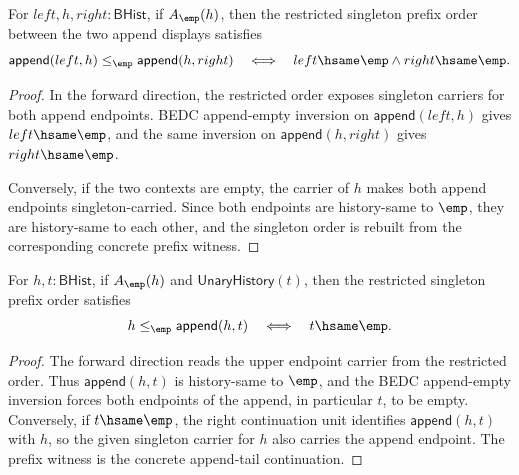 \begin{theorem}
\label{thm:lattice-singleton-le-append-context-empty}
For $left,h,right:\mathsf{BHist}$, if $A_{\emp}(h)$, then the restricted
singleton prefix order between the two append displays satisfies
$$
\mathsf{append}(left,h)\le_{\emp}\mathsf{append}(h,right)
\quad\Longleftrightarrow\quad
left\hsame\emp\wedge right\hsame\emp.
$$
\end{theorem}
\begin{proof}
In the forward direction, the restricted order exposes singleton carriers for
both append endpoints. BEDC append-empty inversion on
$\mathsf{append}(left,h)$ gives $left\hsame\emp$, and the same inversion on
$\mathsf{append}(h,right)$ gives $right\hsame\emp$.

Conversely, if the two contexts are empty, the carrier of $h$ makes both append
endpoints singleton-carried. Since both endpoints are history-same to $\emp$,
they are history-same to each other, and the singleton order is rebuilt from
the corresponding concrete prefix witness.
\end{proof}

\begin{theorem}
\label{thm:lattice-singleton-le-append-tail-upper-empty}
For $h,t:\mathsf{BHist}$, if $A_{\emp}(h)$ and
$\mathsf{UnaryHistory}(t)$, then the restricted singleton prefix order
satisfies
$$
h\le_{\emp}\mathsf{append}(h,t)
\quad\Longleftrightarrow\quad
t\hsame\emp.
$$
\end{theorem}
\begin{proof}
The forward direction reads the upper endpoint carrier from the restricted
order. Thus $\mathsf{append}(h,t)$ is history-same to $\emp$, and the BEDC
append-empty inversion forces both endpoints of the append, in particular
$t$, to be empty. Conversely, if $t\hsame\emp$, the right continuation unit
identifies $\mathsf{append}(h,t)$ with $h$, so the given singleton carrier
for $h$ also carries the append endpoint. The prefix witness is the concrete
append-tail continuation.
\end{proof}

